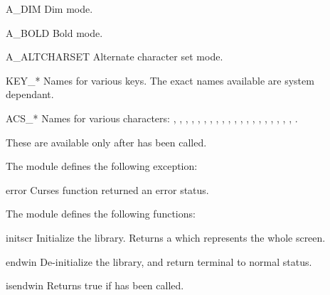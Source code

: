 \begin{datadesc}{A_DIM}
Dim mode.
\end{datadesc}

\begin{datadesc}{A_BOLD}
Bold mode.
\end{datadesc}

\begin{datadesc}{A_ALTCHARSET}
Alternate character set mode.
\end{datadesc}

\begin{datadesc}{KEY_*}
Names for various keys. The exact names available are system dependant.
\end{datadesc}

\begin{datadesc}{ACS_*}
Names for various characters:
, ,
, , ,
, , ,
, , ,
, , ,
, , ,
, , ,
.

 These are available only after  has 
been called.
\end{datadesc}

The module  defines the following exception:
\begin{excdesc}{error}
Curses function returned an error status.
\end{excdesc}

The module  defines the following functions:

\begin{funcdesc}{initscr}{}
Initialize the library. Returns a  which represents
the whole screen.
\end{funcdesc}

\begin{funcdesc}{endwin}{}
De-initialize the library, and return terminal to normal status.
\end{funcdesc}

\begin{funcdesc}{isendwin}{}
Returns true if  has been called.
\end{funcdesc}

